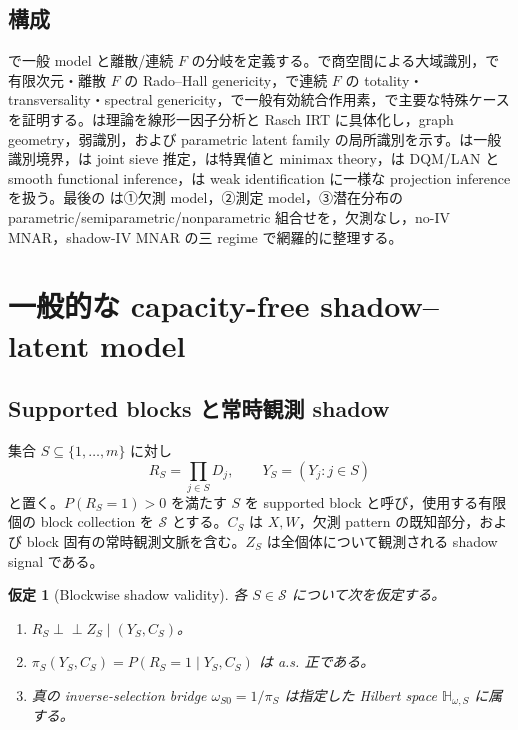 \documentclass[11pt,a4paper]{ltjsarticle}
\newtheorem{assumption}{仮定}[section]
\theoremstyle{remark}
\newcommand{\ind}{\perp\!\!\!\perp}
\newcommand{\cS}{\mathcal S}
\begin{document}
\subsection{構成}
で一般 model と離散/連続 $F$ の分岐を定義する。で商空間による大域識別，で有限次元・離散 $F$ の Rado--Hall genericity，で連続 $F$ の totality・transversality・spectral genericity，で一般有効統合作用素，で主要な特殊ケースを証明する。は理論を線形一因子分析と Rasch IRT に具体化し，graph geometry，弱識別，および parametric latent family の局所識別を示す。は一般識別境界，は joint sieve 推定，は特異値と minimax theory，は DQM/LAN と smooth functional inference，は weak identification に一様な projection inference を扱う。最後の  は①欠測 model，②測定 model，③潜在分布の parametric/semiparametric/nonparametric 組合せを，欠測なし，no-IV MNAR，shadow-IV MNAR の三 regime で網羅的に整理する。

\section{一般的な capacity-free shadow--latent model}\label{sec:model}

\subsection{Supported blocks と常時観測 shadow}
集合 $S\subseteq\{1,\ldots,m\}$ に対し
\[
R_S=\prod_{j\in S}D_j,\qquad Y_S=(Y_j:j\in S)
\]
と置く。$P(R_S=1)>0$ を満たす $S$ を supported block と呼び，使用する有限個の block collection を $\cS$ とする。$C_S$ は $X,W$，欠測 pattern の既知部分，および block 固有の常時観測文脈を含む。$Z_S$ は全個体について観測される shadow signal である。

\begin{assumption}[Blockwise shadow validity]\label{as:shadow}
各 $S\in\cS$ について次を仮定する。
\begin{enumerate}[label=(SV\arabic*)]
\item $R_S\ind Z_S\mid(Y_S,C_S)$。
\item $\pi_S(Y_S,C_S)=P(R_S=1\mid Y_S,C_S)$ は a.s. 正である。
\item 真の inverse-selection bridge $\omega_{S0}=1/\pi_S$ は指定した Hilbert space $\mathbb H_{\omega,S}$ に属する。
\end{enumerate}
\end{assumption}
\end{document}
